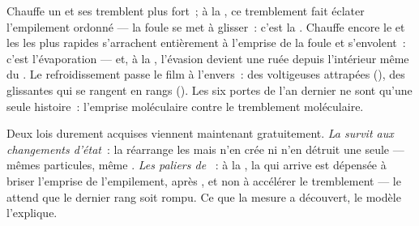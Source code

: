 \begin{example}\label{ex:g7:states-of-matter:doors}
Chauffe un  et ses  tremblent plus fort~; à la
, ce tremblement fait éclater l'empilement
ordonné --- la foule se met à glisser~: c'est la . Chauffe
encore le  et les  les plus rapides s'arrachent
entièrement à l'emprise de la foule et s'envolent~: c'est
l'évaporation --- et, à la , l'évasion
devient une ruée depuis l'intérieur même du . Le
refroidissement passe le film à l'envers~: des voltigeuses attrapées
(), des glissantes qui se rangent en rangs
(). Les six portes de l'an dernier ne sont qu'une seule
histoire~: l'emprise moléculaire contre le tremblement moléculaire.
\end{example}

\begin{example}\label{ex:g7:states-of-matter:free}
Deux lois durement acquises viennent maintenant gratuitement. \emph{La
 survit aux changements d'état}~: la  réarrange les
 mais n'en crée ni n'en détruit une seule --- mêmes
particules, même . \emph{Les paliers de }~: à la
, la  qui arrive est dépensée à briser
l'emprise de l'empilement,  après , et non à
accélérer le tremblement --- le  attend que le dernier
rang soit rompu. Ce que la mesure a découvert, le modèle l'explique.
\end{example}


